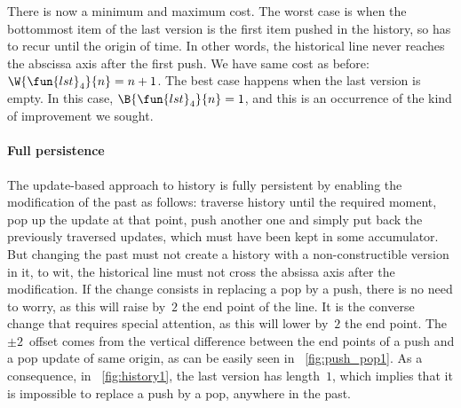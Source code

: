 There is now a minimum and maximum cost. The worst case is when the
bottommost item of the last version is the first item pushed in the
history, so  has to
recur until the origin of time. In other words, the historical line
never reaches the abscissa axis after the first push. We have same
cost as before: \(\W{\fun{lst}_4}{n} = n +
1\).  The best case happens when the
last version is empty. In this case, \(\B{\fun{lst}_4}{n} =
1\), and this is an occurrence of the
kind of improvement we sought.


\paragraph{Full persistence}

The update\hyp{}based approach to history is fully persistent by
enabling the modification of the past as follows: traverse history
until the required moment, pop up the update at that point, push
another one and simply put back the previously traversed updates,
which must have been kept in some accumulator. But changing the past
must not create a history with a non\hyp{}constructible version in it,
to wit, the historical line must not cross the absissa axis after the
modification. If the change consists in replacing a pop by a push,
there is no need to worry, as this will raise by~\(2\) the end point
of the line. It is the converse change that requires special
attention, as this will lower by~\(2\) the end point. The \(\pm
2\)~offset comes from the vertical difference between the end points
of a push and a pop update of same origin, as can be easily seen in
\fig~\vref{fig:push_pop1}. As a consequence, in
\fig~\ref{fig:history1}, the last version has length~\(1\), which
implies that it is impossible to replace a push by a pop, anywhere in
the past.

